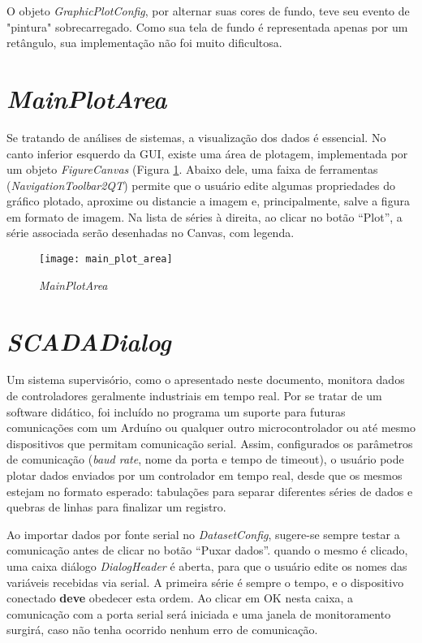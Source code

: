 O objeto \emph{GraphicPlotConfig}, por alternar suas cores de fundo, teve seu evento de "pintura" sobrecarregado. Como sua tela de fundo é representada apenas por um retângulo, sua implementação não foi muito dificultosa.

\section{\emph{MainPlotArea}}

Se tratando de análises de sistemas, a visualização dos dados é essencial. No canto inferior esquerdo da GUI, existe uma área de plotagem, implementada por um objeto \emph{FigureCanvas} (Figura \ref{img_main_plot_area}. Abaixo dele, uma faixa de ferramentas (\emph{NavigationToolbar2QT}) permite que o usuário edite algumas propriedades do gráfico plotado, aproxime ou distancie a imagem e, principalmente, salve a figura em formato de imagem. Na lista de séries à direita, ao clicar no botão “Plot”, a série associada serão desenhadas no Canvas, com legenda.

\begin{figure}[htb]
	\centering
	\caption{\emph{MainPlotArea}}
	\texttt{[image: main\_plot\_area]}
	\label{img_main_plot_area}
\end{figure}

\section{\emph{SCADADialog}}

Um sistema supervisório, como o apresentado neste documento, monitora dados de controladores geralmente industriais em tempo real. Por se tratar de um software didático, foi incluído no programa um suporte para futuras comunicações com um Arduíno ou qualquer outro microcontrolador ou até mesmo dispositivos que permitam comunicação serial. Assim, configurados os parâmetros de comunicação (\emph{baud rate}, nome da porta e tempo de timeout), o usuário pode plotar dados enviados por um controlador em tempo real, desde que os mesmos estejam no formato esperado: tabulações para separar diferentes séries de dados e quebras de linhas para finalizar um registro.

Ao importar dados por fonte serial no \emph{DatasetConfig}, sugere-se sempre testar a comunicação antes de clicar no botão “Puxar dados”. quando o mesmo é clicado, uma caixa diálogo \emph{DialogHeader} é aberta, para que o usuário edite os nomes das variáveis recebidas via serial. A primeira série é sempre o tempo, e o dispositivo conectado \textbf{deve} obedecer esta ordem. Ao clicar em OK nesta caixa, a comunicação com a porta serial será iniciada e uma janela de monitoramento surgirá, caso não tenha ocorrido nenhum erro de comunicação.

